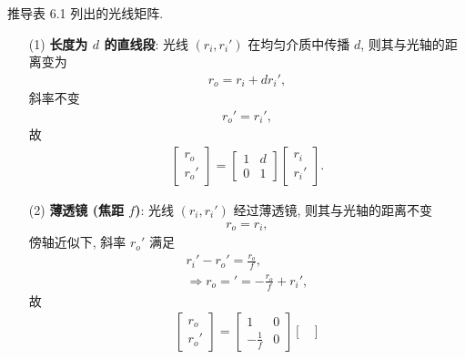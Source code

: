 \documentclass{note}
\begin{document}
\begin{exe}
    推导表 6.1 列出的光线矩阵.
\end{exe}
\begin{pf}
    \begin{itemize}
        \item[(1)] \textbf{长度为 $d$ 的直线段}: 光线 $(r_i,r_i')$ 在均匀介质中传播 $d$, 则其与光轴的距离变为
        \begin{align}
            r_o=r_i+dr_i',
        \end{align}
        斜率不变
        \begin{align}
            r_o'=r_i',
        \end{align}
        故
        \begin{align}
            \begin{bmatrix}
                r_o\\
                r_o'
            \end{bmatrix}=\begin{bmatrix}
                1&d\\
                0&1
            \end{bmatrix}\begin{bmatrix}
                r_i\\
                r_i'
            \end{bmatrix}.
        \end{align}
        \item[(2)] \textbf{薄透镜 (焦距 $f$)}: 光线 $(r_i,r_i')$ 经过薄透镜, 则其与光轴的距离不变
        \begin{align}
            r_o=r_i,
        \end{align}
        傍轴近似下, 斜率 $r_o'$ 满足
        \begin{gather}
            r_i'-r_o'=\frac{r_o}{f},\\
            \Longrightarrow r_o='=-\frac{r_o}{f}+r_i',
        \end{gather}
        故
        \begin{align}
            \begin{bmatrix}
                r_o\\
                r_o'
            \end{bmatrix}=\begin{bmatrix}
                1&0\\
                -\frac{1}{f}&0
            \end{bmatrix}\begin{bmatrix}

\end{bmatrix}
\end{align}
\end{itemize}
\end{pf}
\end{document}
